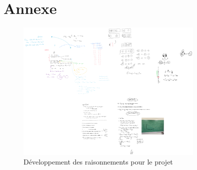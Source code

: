 \documentclass[a4paper, 12pt]{extarticle}
\begin{document}
\newpage
\section{Annexe}
\begin{figure}[H]
    \centering
    \includegraphics[width=0.8\textwidth]{../Fonda.pdf}
    \caption{Développement des raisonnements pour le projet}
    \label{fig:automate}
\end{figure}

\end{document}
